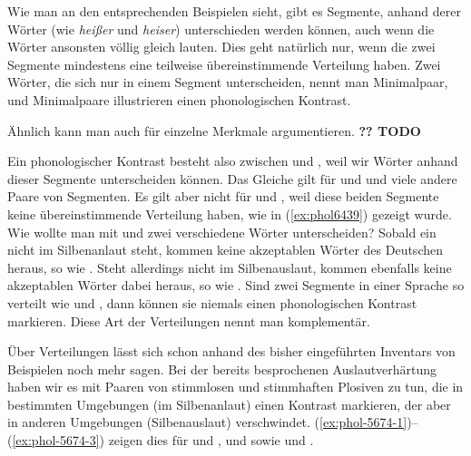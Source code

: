 Wie man an den entsprechenden Beispielen sieht, gibt es Segmente, anhand derer Wörter (wie \textit{heißer} und \textit{heiser}) unterschieden werden können, auch wenn die Wörter ansonsten völlig gleich lauten.
Dies geht natürlich nur, wenn die zwei Segmente mindestens eine teilweise übereinstimmende Verteilung haben.
Zwei Wörter, die sich nur in einem Segment unterscheiden, nennt man Minimalpaar, und Minimalpaare illustrieren einen phonologischen Kontrast.

Ähnlich kann man auch für einzelne Merkmale argumentieren.
\textbf{?? TODO}


Ein phonologischer Kontrast besteht also \zB zwischen \textipa{[t]} und \textipa{[k]}, weil wir Wörter anhand dieser Segmente unterscheiden können.
Das Gleiche gilt für \textipa{[s]} und \textipa{[z]} und viele andere Paare von Segmenten.
Es gilt aber nicht für \textipa{[h]} und \textipa{[N]}, weil diese beiden Segmente keine übereinstimmende Verteilung haben, wie in (\ref{ex:phol6439}) gezeigt wurde.
Wie wollte man mit \textipa{[h]} und \textipa{[N]} zwei verschiedene Wörter unterscheiden?
Sobald ein \textipa{[h]} nicht im Silbenanlaut steht, kommen keine akzeptablen Wörter des Deutschen heraus, so wie \textipa{[SVUh]}.
Steht allerdings \textipa{[N]} nicht im Silbenauslaut, kommen ebenfalls keine akzeptablen Wörter dabei heraus, so wie \textipa{[Nand]}.
Sind zwei Segmente in einer Sprache so verteilt wie \textipa{[h]} und \textipa{[N]}, dann können sie niemals einen phonologischen Kontrast markieren.
Diese Art der Verteilungen nennt man komplementär.


Über Verteilungen lässt sich schon anhand des bisher eingeführten Inventars von Beispielen noch mehr sagen.
Bei der bereits besprochenen Auslautverhärtung haben wir es mit Paaren von stimmlosen und stimmhaften Plosiven zu tun, die in bestimmten Umgebungen (im Silbenanlaut) einen Kontrast markieren, der aber in anderen Umgebungen (Silbenauslaut) verschwindet.
(\ref{ex:phol-5674-1})--(\ref{ex:phol-5674-3}) zeigen dies für \textipa{[g]} und \textipa{[k]}, \textipa{[d]} und \textipa{[t]} sowie \textipa{[b]} und \textipa{[p]}.

